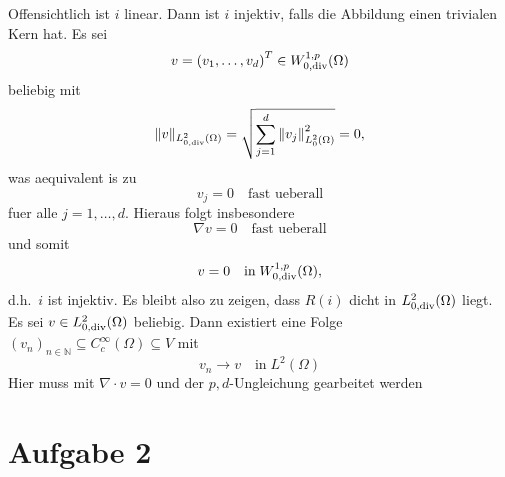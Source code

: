 \documentclass{article}
\begin{document}
Offensichtlich ist $i$ linear. Dann ist $i$ injektiv, falls die Abbildung einen trivialen Kern hat. Es sei
\begin{equation*}
  v = {(v_1, \dots, v_d)}^T \in W_{0, \operatorname{div}}^{1,p}(\Omega)
\end{equation*}
beliebig mit
\begin{equation*}
  \Vert v \Vert_{L_{0, \operatorname{div}}^2(\Omega)}
  = \sqrt{\sum_{j = 1}^{d} {\Vert v_j \Vert}_{L_0^2(\Omega)}^2}
  = 0,
\end{equation*}
was aequivalent is zu
\begin{equation*}
  v_j = 0 \quad \text{fast ueberall}
\end{equation*}
fuer alle $j=1, \dots, d$. Hieraus folgt insbesondere
\begin{equation*}
  \nabla v = 0 \quad \text{fast ueberall}
\end{equation*}
und somit
\begin{equation*}
  v = 0 \quad \text{in} \; W_{0, \operatorname{div}}^{1,p}(\Omega),
\end{equation*}
d.h.\ $i$ ist injektiv. Es bleibt also zu zeigen, dass $R(i)$ dicht in $L_{0, \operatorname{div}}^2(\Omega)$ liegt. Es sei $v \in L_{0, \operatorname{div}}^2(\Omega)$ beliebig. Dann existiert eine Folge $(v_n)_{n \in \mathbb{N}} \subseteq C_c^\infty(\Omega) \subseteq V$ mit
\begin{equation*}
  v_n \rightarrow v \quad \text{in} \; L^2(\Omega)
\end{equation*}
Hier muss mit $\nabla \cdot v = 0$ und der $p,d$-Ungleichung gearbeitet werden

\section*{Aufgabe 2}
\end{document}
